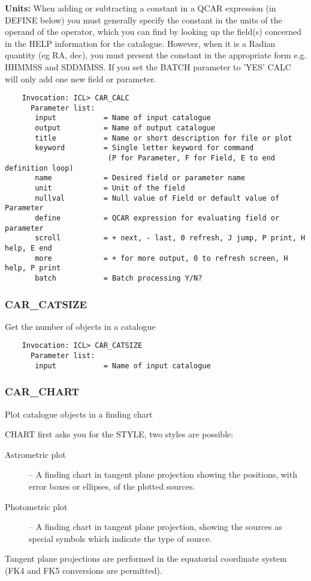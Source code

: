 {\bf Units:} When adding or subtracting a constant in a QCAR expression (in
DEFINE below) you must generally specify the constant in the units of the
operand of the operator, which you can find by looking up the field(s) concerned
in the HELP information for the catalogue.
However, when it is a Radian quantity (eg RA, dec), you must present the
constant in the appropriate form e.g. HHMMSS and SDDMMSS.
If you set the BATCH parameter to 'YES' CALC will only add one new field or
parameter.

\begin{verbatim}
    Invocation: ICL> CAR_CALC
      Parameter list:
       input           = Name of input catalogue
       output          = Name of output catalogue
       title           = Name or short description for file or plot
       keyword         = Single letter keyword for command
                        (P for Parameter, F for Field, E to end definition loop)
       name            = Desired field or parameter name
       unit            = Unit of the field
       nullval         = Null value of Field or default value of Parameter
       define          = QCAR expression for evaluating field or parameter
       scroll          = + next, - last, 0 refresh, J jump, P print, H help, E end
       more            = + for more output, 0 to refresh screen, H help, P print
       batch           = Batch processing Y/N?
\end{verbatim}

\subsubsection{CAR\_CATSIZE}

Get the number of objects in a catalogue

\begin{verbatim}
    Invocation: ICL> CAR_CATSIZE
      Parameter list:
       input           = Name of input catalogue
\end{verbatim}

\subsubsection{CAR\_CHART}

Plot catalogue objects in a finding chart

CHART first asks you for the STYLE, two styles are possible:
\begin{description}
\item [Astrometric plot] -- A finding chart in tangent plane projection showing
the positions, with error boxes or ellipses, of the plotted sources.
\item [Photometric plot] -- A finding chart in tangent plane projection, showing
the sources as special symbols which indicate the type of source.
\end{description}
Tangent plane projections are performed in the equatorial coordinate system
(FK4 and FK5 conversions are permitted).

